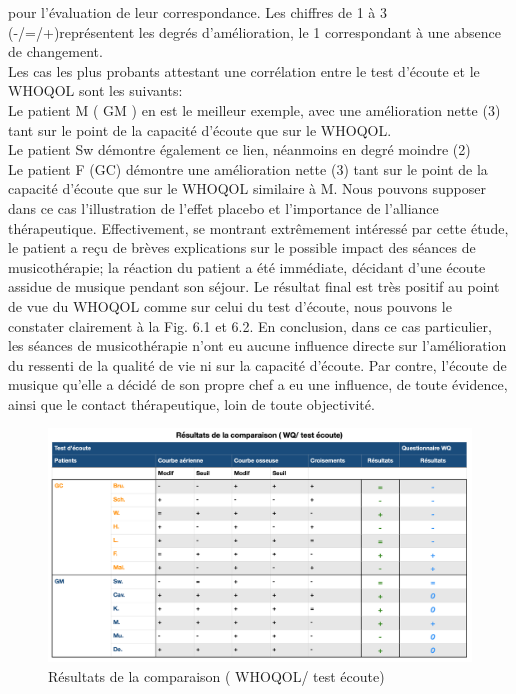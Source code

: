     pour l'évaluation de leur correspondance. Les chiffres de 1 à 3 (-/=/+)représentent les degrés 
    d'amélioration, le 1 
    correspondant à une absence de changement.
    \\ 
    Les cas les plus probants attestant une corrélation entre le test d'écoute et le WHOQOL sont les 
    suivants: 
  \\
  Le patient M ( GM ) en est le meilleur exemple, avec une amélioration nette (3) tant sur le point 
  de la capacité d'écoute que sur le WHOQOL.
   \\
  Le patient Sw démontre également ce lien, néanmoins en degré moindre (2)
   \\
Le patient F (GC) démontre une amélioration nette (3) tant sur le point 
 de la capacité d'écoute que sur le WHOQOL similaire à M.
  Nous pouvons supposer dans ce cas l'illustration de  l'effet placebo et l'importance de  
  l'alliance 
  thérapeutique. Effectivement, se montrant extrêmement intéressé  par cette étude, le patient a 
  reçu de brèves explications 
  sur le possible impact des séances de musicothérapie; la réaction du patient 
  a été immédiate, décidant d'une écoute assidue de musique  pendant son séjour. Le résultat final est 
  très positif au point de 
  vue du WHOQOL comme sur celui du test 
  d'écoute, nous pouvons le constater clairement  à la 
  Fig. 6.1 et 6.2.  En conclusion, dans ce cas particulier, les séances de musicothérapie n'ont eu aucune  
  influence directe sur 
  l'amélioration du ressenti de la qualité de vie ni sur la capacité d'écoute. Par contre, l'écoute de musique 
  qu'elle a décidé de son propre chef a eu une influence, de toute évidence, ainsi que  le contact 
  thérapeutique, loin de toute objectivité. %
   \begin{figure}
  	\centering
  	\includegraphics[width=0.7\columnwidth]{images/graphiques/comparaison_pre_post.png}
  	\caption[Résultats de la comparaison ( WHOQOL/ test écoute)]{Résultats de la comparaison ( 
  		WHOQOL/ test 
  		écoute)}
  	 \end{figure}
